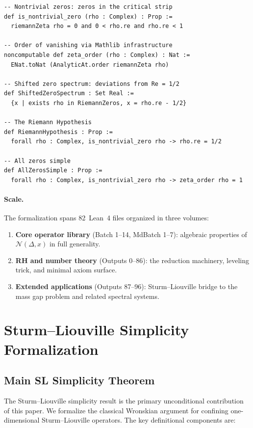 \documentclass[12pt, a4paper]{article}
\theoremstyle{plain}
\theoremstyle{definition}
\newcommand{\N}{\mathcal{N}}
\begin{document}
\begin{lstlisting}[language=Lean4]
-- Nontrivial zeros: zeros in the critical strip
def is_nontrivial_zero (rho : Complex) : Prop :=
  riemannZeta rho = 0 and 0 < rho.re and rho.re < 1

-- Order of vanishing via Mathlib infrastructure
noncomputable def zeta_order (rho : Complex) : Nat :=
  ENat.toNat (AnalyticAt.order riemannZeta rho)

-- Shifted zero spectrum: deviations from Re = 1/2
def ShiftedZeroSpectrum : Set Real :=
  {x | exists rho in RiemannZeros, x = rho.re - 1/2}

-- The Riemann Hypothesis
def RiemannHypothesis : Prop :=
  forall rho : Complex, is_nontrivial_zero rho -> rho.re = 1/2

-- All zeros simple
def AllZerosSimple : Prop :=
  forall rho : Complex, is_nontrivial_zero rho -> zeta_order rho = 1
\end{lstlisting}

\paragraph{Scale.}
The formalization spans 82~Lean~4 files organized in three volumes:
\begin{enumerate}
  \item \textbf{Core operator library} (Batch 1--14, MdBatch 1--7):
        algebraic properties of $\N(\Delta,x)$ in full generality.
  \item \textbf{RH and number theory} (Outputs 0--86):
        the reduction machinery, leveling trick, and minimal axiom surface.
  \item \textbf{Extended applications} (Outputs 87--96):
        Sturm--Liouville bridge to the mass gap problem and related spectral systems.
\end{enumerate}

\section{Sturm--Liouville Simplicity Formalization}
\label{sec:proved}

\subsection{Main SL Simplicity Theorem}
\label{sec:sl_main}

The Sturm--Liouville simplicity result is the primary unconditional contribution
of this paper.
We formalize the classical Wronskian argument for confining one-dimensional
Sturm--Liouville operators.
The key definitional components are:
\end{document}
